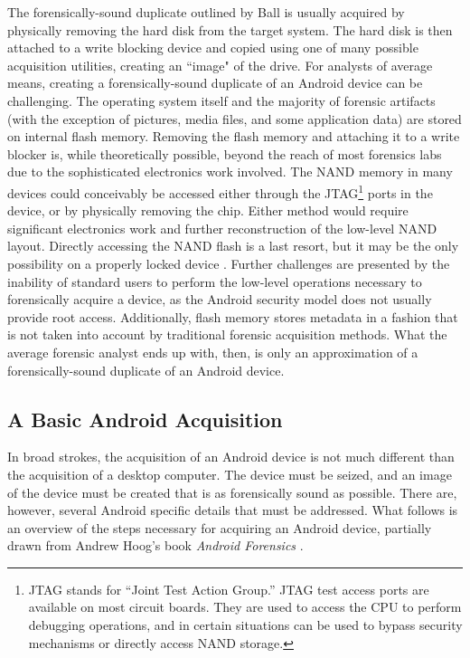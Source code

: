 The forensically-sound duplicate outlined by Ball is usually acquired by physically removing the hard disk from the target system.
The hard disk is then attached to a write blocking device and copied using one of many possible acquisition utilities, creating an
``image" of the drive. For analysts of average means, creating a forensically-sound duplicate of an Android device can be
challenging. The operating system itself and the majority of forensic artifacts (with the exception of pictures, media files, and
some application data) are stored on internal flash memory.  Removing the flash memory and attaching it to a write blocker is, while
theoretically possible, beyond the reach of most forensics labs due to the sophisticated electronics work involved.  The NAND memory in
many devices could conceivably be accessed either through the JTAG\footnote{JTAG stands for ``Joint Test Action Group.'' JTAG test
access ports are available on most circuit boards.  They are used to access the CPU to perform debugging operations, and in certain
situations can be used to bypass security mechanisms or directly access NAND storage.} ports in the device, or by physically
removing the chip.  Either method would require significant electronics work and further reconstruction of the low-level NAND
layout. Directly accessing the NAND flash is a last resort, but it may be the only possibility on a properly locked device
\cite{chipoff}.  Further challenges are presented by the inability of standard users to perform the low-level operations necessary
to forensically acquire a device, as the Android security model does not usually provide root access.  Additionally, flash memory
stores metadata in a fashion that is not taken into account by traditional forensic acquisition methods.  What the average forensic
analyst ends up with, then, is only an approximation of a forensically-sound duplicate of an Android device. 

\subsection{A Basic Android Acquisition}

In broad strokes, the acquisition of an Android device is not much different than the acquisition of a desktop computer. 
The device must be seized, and an image of the device must be created that is as forensically sound as possible.  There are,
however, several Android specific details that must be addressed.  What follows is an overview of the steps necessary for acquiring
an Android device, partially drawn from Andrew Hoog's book \emph{Android Forensics} \cite{hoog}.


